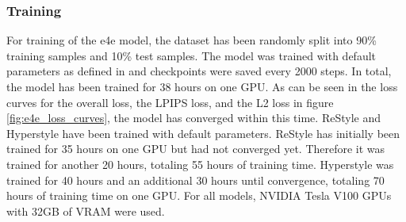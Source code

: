 \subsubsection{Training}
For training of the e4e model, the dataset has been randomly split into 90\% training samples and 10\% test samples. The model was trained with default parameters as defined in \cite{tov2021designing} and checkpoints were saved every 2000 steps.  In total, the model has been trained for 38 hours on one GPU. As can be seen in the loss curves for the overall loss, the LPIPS loss, and the L2 loss in figure \ref{fig:e4e_loss_curves}, the model has converged within this time. ReStyle and Hyperstyle have been trained with default parameters. ReStyle has initially been trained for 35 hours on one GPU but had not converged yet. Therefore it was trained for another 20 hours, totaling 55 hours of training time. Hyperstyle was trained for 40 hours and an additional 30 hours until convergence, totaling 70 hours of training time on one GPU. For all models, NVIDIA Tesla V100 GPUs with 32GB of VRAM were used.




